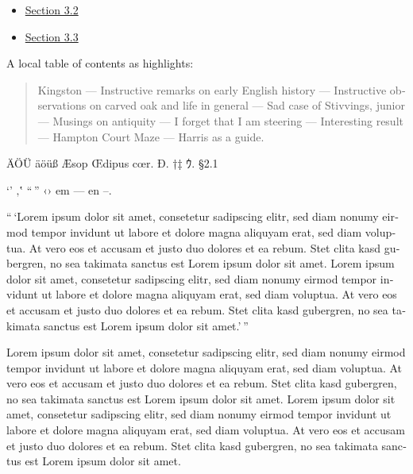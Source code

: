 \documentclass[a5paper]{book}
\begin{document}
\begin{german}
\begin{container}
\begin{itemize}
\item[] \hyperlink{section-3-2}{Section 3.2}

\item[] \hyperlink{section-3-3}{Section 3.3}
\end{itemize}
\end{container}

{\noindent}A local table of contents as highlights:\par

\begin{quotation}
{\noindent}Kingston — Instructive remarks on early English history —
Instructive observations on carved oak and life in general — Sad
case of Stivvings, junior — Musings on antiquity — I forget that I
am steering — Interesting result — Hampton Court Maze — Harris as a
guide.\par
\end{quotation}

ÄÖÜ äöüß Æsop Œdipus cœr. Đ. †‡ ｳ. §2.1\par

‘’ ‚‛ “ ” ‹› em — en –.\par

“ ‘Lorem ipsum dolor sit amet, consetetur sadipscing elitr, sed diam
nonumy eirmod tempor invidunt ut labore et dolore magna aliquyam erat,
sed diam voluptua. At vero eos et accusam et justo duo dolores et ea
rebum. Stet clita kasd gubergren, no sea takimata sanctus est Lorem
ipsum dolor sit amet. Lorem ipsum dolor sit amet, consetetur
sadipscing elitr, sed diam nonumy eirmod tempor invidunt ut labore et
dolore magna aliquyam erat, sed diam voluptua. At vero eos et accusam
et justo duo dolores et ea rebum. Stet clita kasd gubergren, no sea
takimata sanctus est Lorem ipsum dolor sit amet.’ ”\par

Lorem ipsum dolor sit amet, consetetur sadipscing elitr, sed diam
nonumy eirmod tempor invidunt ut labore et dolore magna aliquyam erat,
sed diam voluptua. 
At vero eos et accusam et justo duo dolores
et ea rebum. Stet clita kasd gubergren, no sea takimata sanctus est
Lorem ipsum dolor sit amet. Lorem ipsum dolor sit amet, consetetur
sadipscing elitr, sed diam nonumy eirmod tempor invidunt ut labore et
dolore magna aliquyam erat, sed diam voluptua. At vero eos et accusam
et justo duo dolores et ea rebum. Stet clita kasd gubergren, no sea
takimata sanctus est Lorem ipsum dolor sit amet.\par


\end{german}
\end{document}
